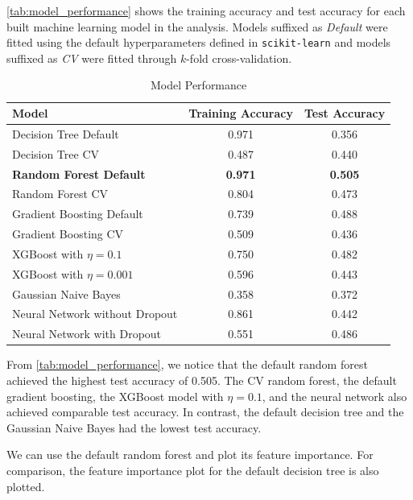 \documentclass{article}
\begin{document}
\autoref*{tab:model_performance} shows the training accuracy and test accuracy for each built machine learning model in the analysis. Models suffixed as \textit{Default} were fitted using the default hyperparameters defined in \texttt{scikit-learn} and models suffixed as \textit{CV} were fitted through \(k\)-fold cross-validation.

\begin{table}[htbp]
    \centering
    \begin{tabular}{lcc}
        \toprule
        \textbf{Model} & \textbf{Training Accuracy} & \textbf{Test Accuracy} \\
        \midrule
        Decision Tree Default & 0.971 & 0.356 \\[3pt]
        Decision Tree CV & 0.487 & 0.440 \\[3pt]
        \textbf{Random Forest Default} & \textbf{0.971} & \textbf{0.505} \\[3pt]
        Random Forest CV & 0.804 & 0.473 \\[3pt]
        Gradient Boosting Default & 0.739 & 0.488 \\[3pt]
        Gradient Boosting CV & 0.509 & 0.436 \\[3pt]
        XGBoost with \(\eta = 0.1\) & 0.750 & 0.482 \\[3pt]
        XGBoost with \(\eta = 0.001\) & 0.596 & 0.443 \\[3pt]
        Gaussian Naive Bayes & 0.358 & 0.372 \\[3pt]
        Neural Network without Dropout & 0.861 & 0.442 \\[3pt]
        Neural Network with Dropout & 0.551 & 0.486 \\
        \bottomrule
    \end{tabular}
    \caption{Model Performance}
    \label{tab:model_performance}
\end{table}

From \autoref*{tab:model_performance}, we notice that the default random forest achieved the highest test accuracy of 0.505. The CV random forest, the default gradient boosting, the XGBoost model with \(\eta=0.1\), and the neural network also achieved comparable test accuracy. In contrast, the default decision tree and the Gaussian Naive Bayes had the lowest test accuracy.

We can use the default random forest and plot its feature importance. For comparison, the feature importance plot for the default decision tree is also plotted.
\end{document}
